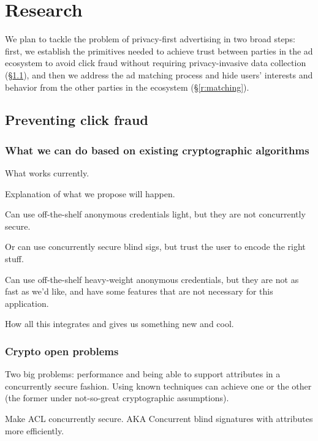 \section{Research}
\label{r:stuff}

%
We plan to tackle the problem of privacy-first advertising in two broad steps:
first, we establish the primitives needed to achieve trust between parties in
the ad ecosystem to avoid click fraud without requiring privacy-invasive data
collection (\S\ref{r:fraud}), and then we address the ad matching process and
hide users' interests and behavior from the other parties in the ecosystem
(\S\ref{r:matching}).
%

\subsection{Preventing click fraud}
\label{r:fraud}

\subsubsection{What we can do based on existing cryptographic algorithms}
What works currently. %

Explanation of what we propose will happen. %

Can use off-the-shelf anonymous credentials light, but they are not concurrently secure. %

Or can use concurrently secure blind sigs, but trust the user to encode the right stuff. %

Can use off-the-shelf heavy-weight anonymous credentials, but they are not as fast as we'd like, and have some features that are not necessary for this application. %

How all this integrates and gives us something new and cool. %

\subsubsection{Crypto open problems}

Two big problems: performance and being able to support attributes in a concurrently secure fashion.  Using known techniques can achieve one or the other (the former under not-so-great cryptographic assumptions).

Make ACL concurrently secure.  AKA Concurrent blind signatures with attributes more efficiently.

